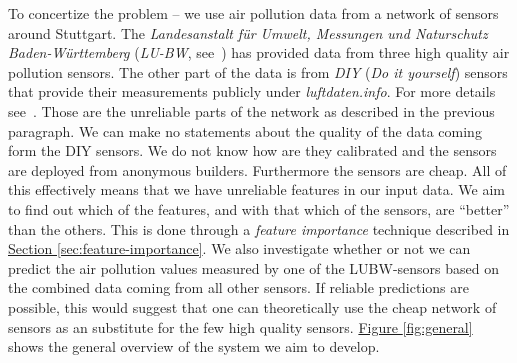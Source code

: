 \documentclass[12pt,a4paper,twoside]{scrartcl}
\numberwithin{equation}{section}
\newcommand{\reffig}[1]{\hyperref[#1]{Figure \ref*{#1}}}
\newcommand{\refsec}[1]{\hyperref[#1]{Section \ref*{#1}}}
\begin{document}
To concertize the problem -- we use air pollution data from a network of sensors around Stuttgart. The \emph{Landesanstalt für Umwelt, Messungen und Naturschutz Baden-Württemberg} (\emph{LU-BW}, see~\cite{lubw}) has provided data from three high quality air pollution sensors. The other part of the data is from \emph{DIY} (\emph{Do it yourself}) sensors that provide their measurements publicly under \emph{luftdaten.info}. For more details see~\cite{luftdaten}. Those are the unreliable parts of the network as described in the previous paragraph. We can make no statements about the quality of the data coming form the DIY sensors. We do not know how are they calibrated and the sensors are deployed from anonymous builders. Furthermore the sensors are cheap. All of this effectively means that we have unreliable features in our input data. We aim to find out which of the features, and with that which of the sensors, are ``better'' than the others. This is done through a \emph{feature importance} technique described in \refsec{sec:feature-importance}. We also investigate whether or not we can predict the air pollution values measured by one of the LUBW-sensors based on the combined data coming from all other sensors. If reliable predictions are possible, this would suggest that one can theoretically use the cheap network of sensors as an substitute for the few high quality sensors. \reffig{fig:general} shows the general overview of the system we aim to develop.
\vfill
\end{document}
